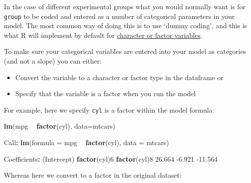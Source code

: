 \documentclass[]{article}
\newenvironment{Shaded}{\begin{snugshade}}{\end{snugshade}}
\newcommand{\DataTypeTok}[1]{\textcolor[rgb]{0.13,0.29,0.53}{#1}}
\newcommand{\DecValTok}[1]{\textcolor[rgb]{0.00,0.00,0.81}{#1}}
\newcommand{\FloatTok}[1]{\textcolor[rgb]{0.00,0.00,0.81}{#1}}
\newcommand{\KeywordTok}[1]{\textcolor[rgb]{0.13,0.29,0.53}{\textbf{#1}}}
\newcommand{\NormalTok}[1]{#1}
\newcommand{\OperatorTok}[1]{\textcolor[rgb]{0.81,0.36,0.00}{\textbf{#1}}}
\newcommand{\StringTok}[1]{\textcolor[rgb]{0.31,0.60,0.02}{#1}}
\providecommand{\tightlist}{%
  \setlength{\itemsep}{0pt}\setlength{\parskip}{0pt}}
\begin{document}
In the case of different experimental groups what you would normally want is for
\texttt{group} to be coded and entered as a number of categorical parameters in your
model. The most common way of doing this is to use `dummy coding', and this is
what R will implement by default for
\protect\hyperlink{character-and-factor}{character or factor variables}.

To make sure your categorical variables are entered into your model as
categories (and not a slope) you can either:

\begin{itemize}
\tightlist
\item
  Convert the variable to a character or factor type in the dataframe or
\item
  Specify that the variable is a factor when you run the model
\end{itemize}

For example, here we specify \texttt{cyl} is a factor within the model formula:

\begin{Shaded}
\begin{Highlighting}[]
\KeywordTok{lm}\NormalTok{(mpg }\OperatorTok{~}\StringTok{ }\KeywordTok{factor}\NormalTok{(cyl), }\DataTypeTok{data=}\NormalTok{mtcars)}

\NormalTok{Call}\OperatorTok{:}
\KeywordTok{lm}\NormalTok{(}\DataTypeTok{formula =}\NormalTok{ mpg }\OperatorTok{~}\StringTok{ }\KeywordTok{factor}\NormalTok{(cyl), }\DataTypeTok{data =}\NormalTok{ mtcars)}

\NormalTok{Coefficients}\OperatorTok{:}
\StringTok{ }\NormalTok{(Intercept)  }\KeywordTok{factor}\NormalTok{(cyl)}\DecValTok{6}  \KeywordTok{factor}\NormalTok{(cyl)}\DecValTok{8}  
      \FloatTok{26.664}        \FloatTok{-6.921}       \FloatTok{-11.564}  
\end{Highlighting}
\end{Shaded}

Whereas here we convert to a factor in the original dataset:

\begin{Shaded}
\end{Shaded}
\end{document}

